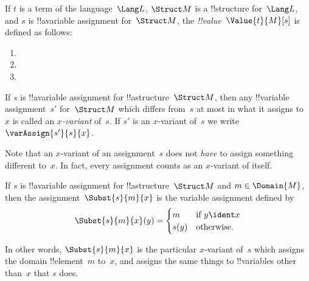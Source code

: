 \documentclass[../../../include/open-logic-section]{subfiles}
\begin{document}
\begin{defn}
If $t$ is a term of the language~$\Lang L$, $\Struct M$ is a
!!{structure} for~$\Lang L$, and $s$ is !!a{variable} assignment
for~$\Struct M$, the \emph{!!{value}}~$\Value{t}{M}[s]$ is defined as
follows:
\begin{enumerate}
\item {}
\item {}
\item {}
\end{enumerate}
\end{defn}

\begin{defn}[$x$-Variant]
If $s$ is !!a{variable} assignment for !!a{structure}~$\Struct M$, then any
!!{variable} assignment~$s'$ for~$\Struct M$ which differs from~$s$ at most
in what it assigns to~$x$ is called an \emph{$x$-variant} of~$s$.  If
$s'$ is an $x$-variant of~$s$ we write $\varAssign{s'}{s}{x}$.
\end{defn}

\begin{explain}
Note that an $x$-variant of an assignment~$s$ does not \emph{have} to
assign something different to~$x$.  In fact, every assignment counts
as an $x$-variant of itself.
\end{explain}

\begin{defn}
  If $s$ is !!a{variable} assignment for !!a{structure}~$\Struct M$
  and $m \in \Domain{M}$, then the assignment~$\Subst{s}{m}{x}$ is the
  variable assignment defined by
  \[\Subst{s}{m}{x}(y) = \begin{cases}
    m & \text{if } y \ident x\\
    s(y) & \text{otherwise}.
  \end{cases}\]
\end{defn}

In other words, $\Subst{s}{m}{x}$ is the particular $x$-variant of~$s$
which assigns the domain !!{element}~$m$ to~$x$, and assigns the same
things to !!{variable}s other than~$x$ that $s$ does.
\end{document}

